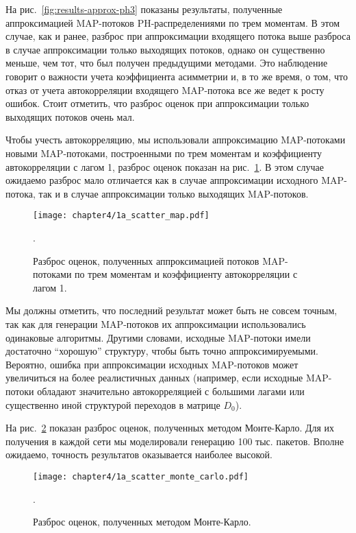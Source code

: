 На рис.~\ref{fig:results-approx-ph3} показаны результаты, полученные аппроксимацией MAP-потоков PH-распределениями по трем моментам. В этом случае, как и ранее, разброс при аппроксимации входящего потока выше разброса в случае аппроксимации только выходящих потоков, однако он существенно меньше, чем тот, что был получен предыдущими методами. Это наблюдение говорит о важности учета коэффициента асимметрии и, в то же время, о том, что отказ от учета автокорреляции входящего MAP-потока все же ведет к росту ошибок. Стоит отметить, что разброс оценок при аппроксимации только выходящих потоков очень мал.

Чтобы учесть автокорреляцию, мы использовали аппроксимацию MAP-потоками новыми MAP-потоками, построенными по трем моментам и коэффициенту автокорреляции с лагом 1, разброс оценок показан на рис.~\ref{fig:results-approx-map}. В этом случае ожидаемо разброс мало отличается как в случае аппроксимации исходного MAP-потока, так и в случае аппроксимации только выходящих MAP-потоков.

\begin{figure}[h]
    \texttt{[image: chapter4/1a\_scatter\_map.pdf]}
    \caption{Разброс оценок, полученных аппроксимацией потоков MAP-потоками по трем моментам и коэффициенту автокорреляции с лагом 1.}.\label{fig:results-approx-map}
\end{figure}

Мы должны отметить, что последний результат может быть не совсем точным, так как для генерации MAP-потоков их аппроксимации использовались одинаковые алгоритмы. Другими словами, исходные MAP-потоки имели достаточно ``хорошую'' структуру, чтобы быть точно аппроксимируемыми. Вероятно, ошибка при аппроксимации исходных MAP-потоков может увеличиться на более реалистичных данных (например, если исходные MAP-потоки обладают значительно автокорреляцией с большими лагами или существенно иной структурой переходов в матрице $D_0$).

На рис.~\ref{fig:results-approx-mc} показан разброс оценок, полученных методом Монте-Карло. Для их получения в каждой сети мы моделировали генерацию 100 тыс. пакетов. Вполне ожидаемо, точность результатов оказывается наиболее высокой.

\begin{figure}[h]
    \texttt{[image: chapter4/1a\_scatter\_monte\_carlo.pdf]}
    \caption{Разброс оценок, полученных методом Монте-Карло.}.\label{fig:results-approx-mc}
\end{figure}

